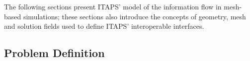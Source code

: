 The following sections present ITAPS' %
model of the information
flow in mesh-based simulations; these sections also introduce the
concepts of geometry, mesh and solution fields used to define ITAPS'
interoperable interfaces.



\subsection{Problem Definition}\label{sec:probDef}


